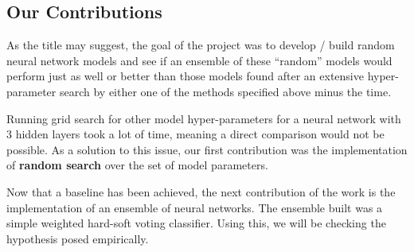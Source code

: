 \documentclass[12pt]{article}
\newcommand{\pbreak}{\vspace{4mm}}
\begin{document}
\subsection{Our Contributions}
\begin{flushleft}
As the title may suggest, the goal of the project was to develop / build random neural network models and see if an ensemble of these ``random'' models would perform just as well or better than those models found after an extensive hyper-parameter search by either one of the methods specified above minus the time.
\pbreak

Running grid search for other model hyper-parameters for a neural network with 3 hidden layers took a lot of time, meaning a direct comparison would not be possible. As a solution to this issue, our first contribution was the implementation of \textbf{random search} over the set of model parameters.
\pbreak

Now that a baseline has been achieved, the next contribution of the work is the implementation of an ensemble of neural networks. The ensemble built was a simple weighted hard-soft voting classifier. Using this, we will be checking the hypothesis posed empirically.
\end{flushleft}
\end{document}
